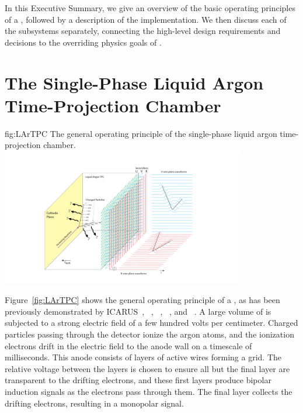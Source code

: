In this Executive Summary, we give an overview of the basic operating principles of a  , followed by a description of the  implementation. We then discuss each of the subsystems separately, connecting the high-level design requirements and decisions to the overriding physics goals of .

\section{The Single-Phase Liquid Argon Time-Projection Chamber}
\label{sec:fdsp-exec-splar}

\begin{dunefigure}{fig:LArTPC}
{The general operating principle of the single-phase liquid argon time-projection chamber.}
\includegraphics[trim={5cm 0 5cm 0},clip,width=0.8\textwidth]{graphics/TheBoPicture.pdf}
\end{dunefigure}

Figure~\ref{fig:LArTPC} shows the general operating principle of a  , as has been previously demonstrated by
ICARUS~\cite{Icarus-T600},
~\cite{Anderson:2012vc}, ~\cite{microboone}, ~\cite{Cavanna:2014iqa}, and ~\cite{Abi:2017aow}. A large volume of  is subjected to a strong electric field of a few hundred volts per centimeter. Charged particles passing through the detector ionize the argon atoms, and the ionization electrons drift in the electric field to the anode wall on a timescale of milliseconds. This anode consists of layers of active wires forming a grid. The relative voltage between the layers is chosen to ensure all but the final layer are transparent to the drifting electrons, and these first layers produce bipolar induction signals as the electrons pass through them. The final layer collects the drifting electrons, resulting in a monopolar signal.

